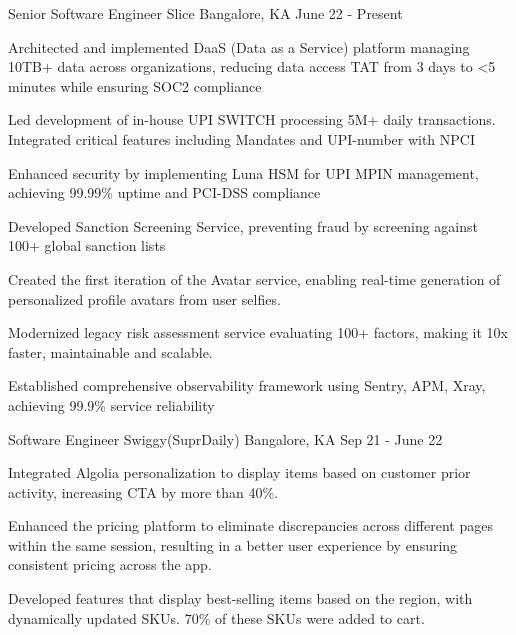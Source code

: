 \begin{cventries}
  \cventry
    {Senior Software Engineer}
    {Slice}
    {Bangalore, KA}
    {June 22 - Present}
    {
      \begin{cvitems}
        \item {Architected and implemented DaaS (Data as a Service) platform managing 10TB+ data across organizations, reducing data access TAT from 3 days to <5 minutes while ensuring SOC2 compliance}
        \item {Led development of in-house UPI SWITCH processing 5M+ daily transactions. Integrated critical features including Mandates and UPI-number with NPCI}
        \item {Enhanced security by implementing Luna HSM for UPI MPIN management, achieving 99.99\% uptime and PCI-DSS compliance}
        \item {Developed Sanction Screening Service, preventing fraud by screening against 100+ global sanction lists}
        \item {Created the first iteration of the Avatar service, enabling real-time generation of personalized profile avatars from user selfies.}
        \item {Modernized legacy risk assessment service evaluating 100+ factors, making it 10x faster, maintainable and scalable.}
        \item {Established comprehensive observability framework using Sentry, APM, Xray, achieving 99.9\% service reliability}
      \end{cvitems}
    }
  
  \cventry
    {Software Engineer}
    {Swiggy(SuprDaily)}
    {Bangalore, KA}
    {Sep 21 - June 22}
    {
      \begin{cvitems}
        \item {Integrated Algolia personalization to display items based on customer prior activity, increasing CTA by more than 40\%.}
        \item {Enhanced the pricing platform to eliminate discrepancies across different pages within the same session, resulting in a better user experience by ensuring consistent pricing across the app.}
        \item {Developed features that display best-selling items based on the region, with dynamically updated SKUs. 70\% of these SKUs were added to cart.}
      \end{cvitems}
    }
  

\end{cventries}
